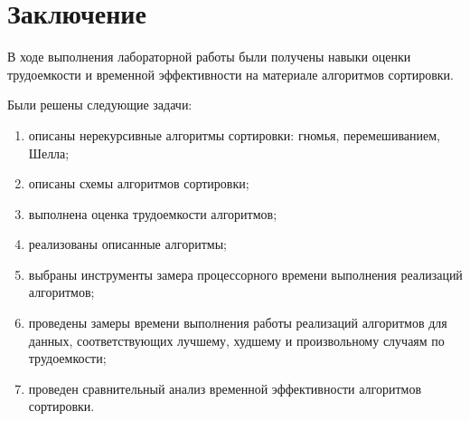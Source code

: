 \section*{Заключение}

В ходе выполнения лабораторной работы были получены навыки оценки трудоемкости
и временной эффективности на материале алгоритмов сортировки.

Были решены следующие задачи:
\begin{enumerate}
    \item описаны нерекурсивные алгоритмы сортировки: гномья, перемешиванием,
          Шелла;
    \item описаны схемы алгоритмов сортировки;
    \item выполнена оценка трудоемкости алгоритмов;
    \item реализованы описанные алгоритмы;
    \item выбраны инструменты замера процессорного времени выполнения реализаций
          алгоритмов;
    \item проведены замеры времени выполнения работы реализаций алгоритмов для
          данных, соответствующих лучшему, худшему и произвольному случаям
          по трудоемкости;
    \item проведен сравнительный анализ временной эффективности алгоритмов
          сортировки.
\end{enumerate}

